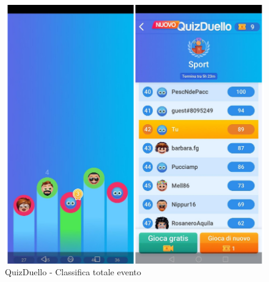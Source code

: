 \documentclass{article}
\begin{document}
\begin{figure}[htp]
\begin{center}
\includegraphics[width=1 \textwidth]{Figure25.png}
\caption{QuizDuello - Classifica totale evento}
\end{center}
\end{figure}
\end{document}
